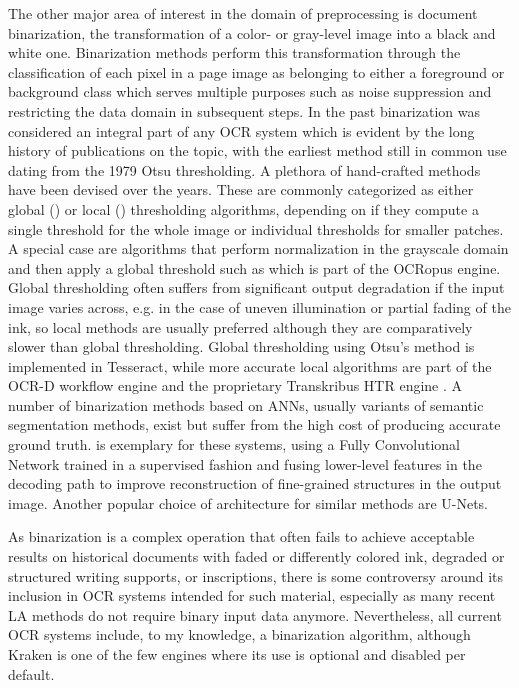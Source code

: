 The other major area of interest in the domain of preprocessing is document
binarization, the transformation of a color- or gray-level image into a black
and white one. Binarization methods perform this transformation through the
classification of each pixel in a page image as belonging to either a
foreground or background class which serves multiple purposes such as noise
suppression and restricting the data domain in subsequent steps. In the past
binarization was considered an integral part of any OCR system which is evident
by the long history of publications on the topic, with the earliest method
still in common use dating from the 1979 Otsu
thresholding\cite{otsu1979threshold}. A plethora of hand-crafted methods have
been devised over the years. These are commonly categorized as either global
(\cite{otsu1979threshold}) or local
(\cite{sauvola2000adaptive,niblack1986introduction,kim2002document,gatos2004adaptive})
thresholding algorithms, depending on if they compute a single threshold for
the whole image or individual thresholds for smaller patches. A special case
are algorithms that perform normalization in the grayscale domain and then
apply a global threshold such as \cite{shafait2008efficient} which is part of
the OCRopus engine. Global thresholding often suffers from significant output
degradation if the input image varies across, e.g. in the case of uneven
illumination or partial fading of the ink, so local methods are usually
preferred although they are comparatively slower than global thresholding.
Global thresholding using Otsu's method is implemented in Tesseract, while more
accurate local algorithms are part of the OCR-D workflow engine
\cite{neudecker2019ocr} and the proprietary Transkribus HTR engine
\cite{ntirogiannis2014combined}. A number of binarization methods based on
ANNs, usually variants of semantic segmentation methods, exist but suffer from
the high cost of producing accurate ground truth. \cite{tensmeyer2017document}
is exemplary for these systems, using a Fully Convolutional Network
\cite{long2015fully} trained in a supervised fashion and fusing lower-level
features in the decoding path to improve reconstruction of fine-grained
structures in the output image.  Another popular choice of architecture for
similar methods are U-Nets\cite{ronneberger2015u}.

As binarization is a complex operation that often fails to achieve acceptable
results on historical documents with faded or differently colored ink, degraded
or structured writing supports, or inscriptions, there is some controversy
around its inclusion in OCR systems intended for such material, especially as
many recent LA methods do not require binary input data anymore. Nevertheless,
all current OCR systems include, to my knowledge, a binarization algorithm,
although Kraken is one of the few engines where its use is optional and
disabled per default.

